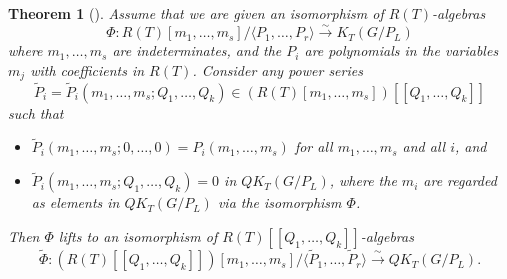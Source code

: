 \documentclass[a4paper, 11pt, reqno]{amsart}
\numberwithin{equation}{section}
\newcommand{\bra}[1]{[\![ #1 ]\!]}
\newcommand{\ti}[1]{\widetilde{#1}}
\theoremstyle{plain}
\newtheorem{thm}{Theorem}[section]
\theoremstyle{definition}
\theoremstyle{remark}
\begin{document}
\begin{thm}[{\cite[Theorem~4.1]{GMSXZZ2}}] \label{thm:Nakayama}
Assume that we are given an isomorphism of $R(T)$-algebras
\begin{equation}
\Phi: R(T)[m_{1}, \ldots, m_{s}]/\langle P_{1}, \ldots, P_{r} \rangle \xrightarrow{\sim} K_{T}(G/P_{L})
\end{equation}
where $m_{1}, \ldots, m_{s}$ are indeterminates, and the $P_{i}$ are polynomials in the variables $m_{j}$ with coefficients in $R(T)$. 
Consider any power series
\begin{equation}
\ti{P}_{i} = \ti{P}_{i}(m_{1}, \ldots, m_{s}; Q_{1}, \ldots, Q_{k}) \in (R(T)[m_{1}, \ldots, m_{s}])\bra{Q_{1}, \ldots, Q_{k}}
\end{equation}
such that 
\begin{itemize}
\item $\ti{P}_{i}(m_{1}, \ldots, m_{s}; 0, \ldots, 0) = P_{i}(m_{1}, \ldots, m_{s})$ for all $m_{1}, \ldots, m_{s}$ and all $i$, and 
\item $\ti{P}_{i}(m_{1}, \ldots, m_{s}; Q_{1}, \ldots, Q_{k}) = 0$ in $QK_{T}(G/P_{L})$, where the $m_{i}$ are regarded as elements in $QK_{T}(G/P_{L})$ via the isomorphism $\Phi$. 
\end{itemize}
Then $\Phi$ lifts to an isomorphism of $R(T)\bra{Q_{1}, \ldots, Q_{k}}$-algebras
\begin{equation}
\ti{\Phi}: (R(T)\bra{Q_{1}, \ldots, Q_{k}})[m_{1}, \ldots, m_{s}]/\langle \ti{P}_{1}, \ldots, \ti{P}_{r} \rangle \xrightarrow{\sim} QK_{T}(G/P_{L}). 
\end{equation}
\end{thm}
\end{document}
